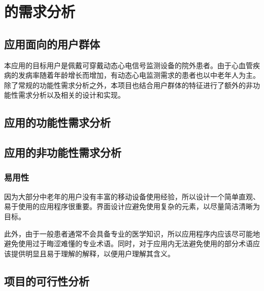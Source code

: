 

\chapter{\app 的需求分析}\label{ch:req}


\section{应用面向的用户群体}\label{sec:target-user}

本应用的目标用户是佩戴可穿戴动态心电信号监测设备的院外患者。由于心血管疾病的发病率随着年龄增长而增加\cite{Zhongguoxinxieguanjiankangyujibingbaogao20212022}，有动态心电监测需求的患者也以中老年人为主。除了常规的功能性需求分析之外，本项目也结合用户群体的特征进行了额外的非功能性需求分析以及相关的设计和实现。


\section{应用的功能性需求分析}\label{sec:func-req}



\section{应用的非功能性需求分析}\label{sec:nonfunc-req}

\subsection{易用性}\label{subsec:usability}

因为大部分中老年的用户没有丰富的移动设备使用经验，所以设计一个简单直观、易于使用的应用程序很重要。界面设计应避免使用复杂的元素，以尽量简洁清晰为目标。

此外，由于一般患者通常不会具备专业的医学知识，所以应用程序内应该尽可能地避免使用过于晦涩难懂的专业术语。同时，对于应用内无法避免使用的部分术语应该提供明显且易于理解的解释，以便用户理解其含义。


\section{项目的可行性分析}\label{sec:feasibility}

